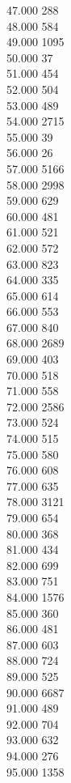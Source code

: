 { 47.000	288 \\
 48.000	584 \\
 49.000	1095 \\
 50.000	37 \\
 51.000	454 \\
 52.000	504 \\
 53.000	489 \\
 54.000	2715 \\
 55.000	39 \\
 56.000	26 \\
 57.000	5166 \\
 58.000	2998 \\
 59.000	629 \\
 60.000	481 \\
 61.000	521 \\
 62.000	572 \\
 63.000	823 \\
 64.000	335 \\
 65.000	614 \\
 66.000	553 \\
 67.000	840 \\
 68.000	2689 \\
 69.000	403 \\
 70.000	518 \\
 71.000	558 \\
 72.000	2586 \\
 73.000	524 \\
 74.000	515 \\
 75.000	580 \\
 76.000	608 \\
 77.000	635 \\
 78.000	3121 \\
 79.000	654 \\
 80.000	368 \\
 81.000	434 \\
 82.000	699 \\
 83.000	751 \\
 84.000	1576 \\
 85.000	360 \\
 86.000	481 \\
 87.000	603 \\
 88.000	724 \\
 89.000	525 \\
 90.000	6687 \\
 91.000	489 \\
 92.000	704 \\
 93.000	632 \\
 94.000	276 \\
 95.000	1358 \\
}

